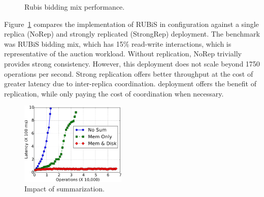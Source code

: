 \begin{figure}[t]
  \centering
	\caption{Rubis bidding mix performance.}
  \label{grf:rubis}
\end{figure}


Figure~\ref{grf:rubis} compares the \quelea implementation of RUBiS in 
configuration against a single replica (NoRep) and strongly replicated
(StrongRep)  deployment. The benchmark was RUBiS bidding mix, which has
15\% read-write interactions, which is representative of the auction workload.
Without replication, NoRep trivially provides strong consistency. However, this
deployment does not scale beyond 1750 operations per second. Strong replication
offers better throughput at the cost of greater latency due to inter-replica
coordination. \quelea deployment offers the benefit of replication, while only
paying the cost of coordination when necessary.

\begin{figure}[t]
\centering
\includegraphics[width=0.45\textwidth]{graphs/summarization.pdf}
\caption{Impact of summarization.}
\label{grf:summarization}
\end{figure}

